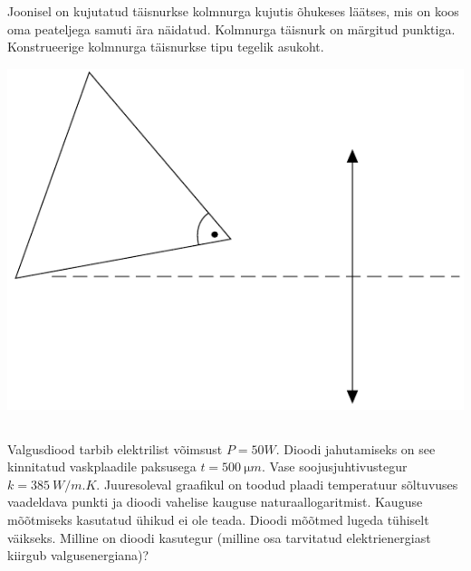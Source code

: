 \documentclass[10pt]{article}
\begin{document}

Joonisel on kujutatud täisnurkse kolmnurga kujutis õhukeses läätses, mis on koos oma peateljega samuti ära näidatud. Kolmnurga täisnurk on märgitud punktiga. Konstrueerige kolmnurga täisnurkse tipu tegelik asukoht.
\begin{center}
	\includegraphics[width = 0.6\linewidth]{2018-lahg-08-yl.pdf}
\end{center}
\probend
\bigskip
\newpage\subsection{\protect{}}


Valgusdiood tarbib elektrilist võimsust $P=\SI{50}W$. Dioodi jahutamiseks on see kinnitatud vaskplaadile paksusega $t=\SI{500}{\micro m}$. Vase soojusjuhtivustegur $k=\SI{385}{W/m.K}$. Juuresoleval graafikul on toodud plaadi temperatuur sõltuvuses vaadeldava punkti ja dioodi vahelise kauguse naturaallogaritmist. Kauguse mõõtmiseks kasutatud ühikud ei ole teada. Dioodi mõõtmed lugeda tühiselt väikseks. Milline on dioodi kasutegur (milline osa tarvitatud elektrienergiast kiirgub valgusenergiana)?
\end{document}
